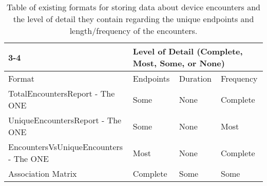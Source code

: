 \begin{table}
\small
\begin{tabular}{|p{5.5cm}|p{1.5cm}|p{1.5cm}|p{1.5cm}|}
\cline{3-4}
\multicolumn{1}{}{} & \multicolumn{3}{|p{4.5cm}|}{Level of Detail (Complete, Most, Some, or None)} \\ \hline
 Format&Endpoints&Duration&Frequency\\ \hline
 TotalEncountersReport - The ONE \cite{Keranen2009}&Some&None&Complete \\ \hline
 UniqueEncountersReport - The ONE \cite{Keranen2009}&Some&None&Most \\ \hline
 EncountersVsUniqueEncounters - The ONE \cite{Keranen2009}&Most&None&Complete \\ \hline
 Association Matrix \cite{Thakur2012}&Complete&Some&Some \\ \hline
 
\end{tabular}
\caption{Table of existing formats for storing data about device encounters and the level of detail they contain regarding the unique endpoints and length/frequency of the encounters.}
\label{formatTable}
\end{table}
